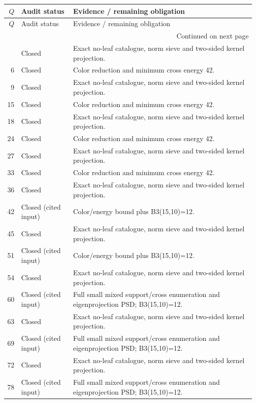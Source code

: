 \begin{longtable}{@{}r p{31mm} p{102mm}@{}}
\toprule
$Q$ & Audit status & Evidence / remaining obligation \\
\midrule
\endfirsthead
\toprule
$Q$ & Audit status & Evidence / remaining obligation \\
\midrule
\endhead
\midrule\multicolumn{3}{r}{\small Continued on next page}\\
\endfoot
\bottomrule
\endlastfoot
0 & Closed & Exact no-leaf catalogue, norm sieve and two-sided kernel projection. \\
6 & Closed & Color reduction and minimum cross energy 42. \\
9 & Closed & Exact no-leaf catalogue, norm sieve and two-sided kernel projection. \\
15 & Closed & Color reduction and minimum cross energy 42. \\
18 & Closed & Exact no-leaf catalogue, norm sieve and two-sided kernel projection. \\
24 & Closed & Color reduction and minimum cross energy 42. \\
27 & Closed & Exact no-leaf catalogue, norm sieve and two-sided kernel projection. \\
33 & Closed & Color reduction and minimum cross energy 42. \\
36 & Closed & Exact no-leaf catalogue, norm sieve and two-sided kernel projection. \\
42 & Closed (cited input) & Color/energy bound plus B3(15,10)=12. \\
45 & Closed & Exact no-leaf catalogue, norm sieve and two-sided kernel projection. \\
51 & Closed (cited input) & Color/energy bound plus B3(15,10)=12. \\
54 & Closed & Exact no-leaf catalogue, norm sieve and two-sided kernel projection. \\
60 & Closed (cited input) & Full small mixed support/cross enumeration and eigenprojection PSD; B3(15,10)=12. \\
63 & Closed & Exact no-leaf catalogue, norm sieve and two-sided kernel projection. \\
69 & Closed (cited input) & Full small mixed support/cross enumeration and eigenprojection PSD; B3(15,10)=12. \\
72 & Closed & Exact no-leaf catalogue, norm sieve and two-sided kernel projection. \\
78 & Closed (cited input) & Full small mixed support/cross enumeration and eigenprojection PSD; B3(15,10)=12. \\

\end{longtable}
